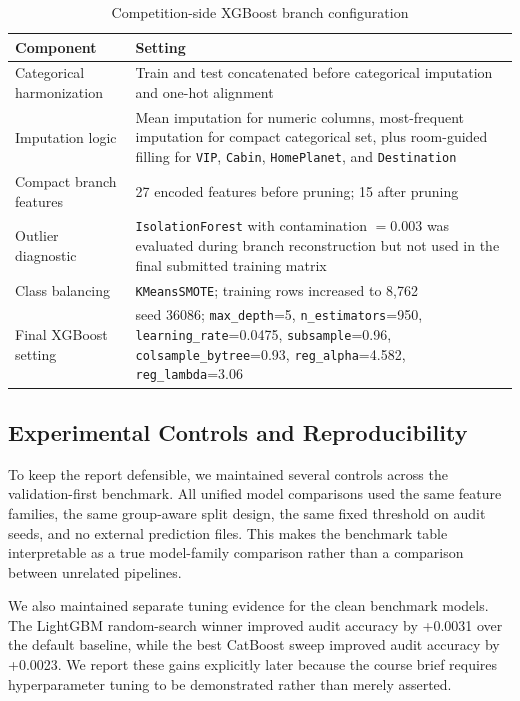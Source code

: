 \documentclass[conference]{IEEEtran}
\begin{document}
\begin{table}[!t]
\caption{Competition-side XGBoost branch configuration}
\label{tab:xgb-config}
\centering
\scriptsize
\begin{tabularx}{\columnwidth}{>{\raggedright\arraybackslash}p{}X}
\toprule
Component & Setting \\
\midrule
Categorical harmonization & Train and test concatenated before categorical imputation and one-hot alignment \\
Imputation logic & Mean imputation for numeric columns, most-frequent imputation for compact categorical set, plus room-guided filling for \texttt{VIP}, \texttt{Cabin}, \texttt{HomePlanet}, and \texttt{Destination} \\
Compact branch features & 27 encoded features before pruning; 15 after pruning \\
Outlier diagnostic & \texttt{IsolationForest} with contamination $=0.003$ was evaluated during branch reconstruction but not used in the final submitted training matrix \\
Class balancing & \texttt{KMeansSMOTE}; training rows increased to 8,762 \\
Final XGBoost setting & seed 36086; \texttt{max\_depth}=5, \texttt{n\_estimators}=950, \texttt{learning\_rate}=0.0475, \texttt{subsample}=0.96, \texttt{colsample\_bytree}=0.93, \texttt{reg\_alpha}=4.582, \texttt{reg\_lambda}=3.06 \\
\bottomrule
\end{tabularx}
\end{table}

\subsection{Experimental Controls and Reproducibility}
To keep the report defensible, we maintained several controls across the validation-first benchmark. All unified model comparisons used the same feature families, the same group-aware split design, the same fixed threshold on audit seeds, and no external prediction files. This makes the benchmark table interpretable as a true model-family comparison rather than a comparison between unrelated pipelines.

We also maintained separate tuning evidence for the clean benchmark models. The LightGBM random-search winner improved audit accuracy by +0.0031 over the default baseline, while the best CatBoost sweep improved audit accuracy by +0.0023. We report these gains explicitly later because the course brief requires hyperparameter tuning to be demonstrated rather than merely asserted.
\end{document}
